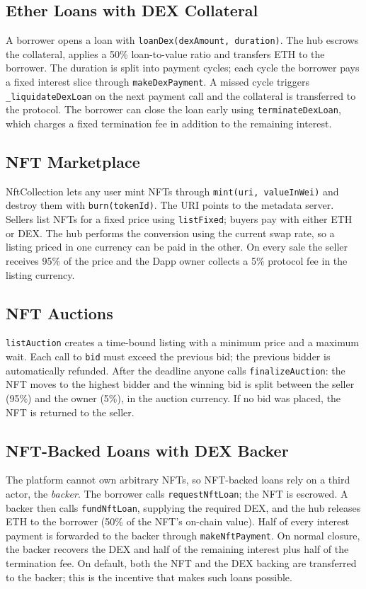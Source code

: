 \documentclass[12pt,a4paper]{article}
\begin{document}
\subsection{Ether Loans with DEX Collateral}
A borrower opens a loan with \texttt{loanDex(dexAmount, duration)}. The hub escrows the collateral, applies a 50\% loan-to-value ratio and transfers ETH to the borrower. The duration is split into payment cycles; each cycle the borrower pays a fixed interest slice through \texttt{makeDexPayment}. A missed cycle triggers \texttt{\_liquidateDexLoan} on the next payment call and the collateral is transferred to the protocol. The borrower can close the loan early using \texttt{terminateDexLoan}, which charges a fixed termination fee in addition to the remaining interest.

\subsection{NFT Marketplace}
NftCollection lets any user mint NFTs through \texttt{mint(uri, valueInWei)} and destroy them with \texttt{burn(tokenId)}. The URI points to the metadata server. Sellers list NFTs for a fixed price using \texttt{listFixed}; buyers pay with either ETH or DEX. The hub performs the conversion using the current swap rate, so a listing priced in one currency can be paid in the other. On every sale the seller receives 95\% of the price and the Dapp owner collects a 5\% protocol fee in the listing currency.

\subsection{NFT Auctions}
\texttt{listAuction} creates a time-bound listing with a minimum price and a maximum wait. Each call to \texttt{bid} must exceed the previous bid; the previous bidder is automatically refunded. After the deadline anyone calls \texttt{finalizeAuction}: the NFT moves to the highest bidder and the winning bid is split between the seller (95\%) and the owner (5\%), in the auction currency. If no bid was placed, the NFT is returned to the seller.

\subsection{NFT-Backed Loans with DEX Backer}
The platform cannot own arbitrary NFTs, so NFT-backed loans rely on a third actor, the \emph{backer}. The borrower calls \texttt{requestNftLoan}; the NFT is escrowed. A backer then calls \texttt{fundNftLoan}, supplying the required DEX, and the hub releases ETH to the borrower (50\% of the NFT's on-chain value). Half of every interest payment is forwarded to the backer through \texttt{makeNftPayment}. On normal closure, the backer recovers the DEX and half of the remaining interest plus half of the termination fee. On default, both the NFT and the DEX backing are transferred to the backer; this is the incentive that makes such loans possible.
\end{document}
